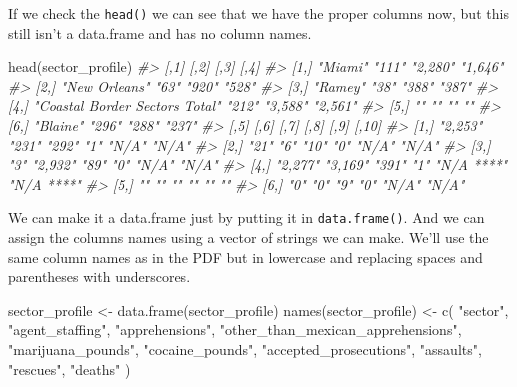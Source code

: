 \documentclass[
]{krantz}
\makeatletter
\newenvironment{Shaded}{\begin{snugshade}}{\end{snugshade}}
\newcommand{\CommentTok}[1]{\textcolor[rgb]{0.37,0.37,0.37}{\textit{#1}}}
\newcommand{\FunctionTok}[1]{\textcolor[rgb]{0,0,0}{#1}}
\newcommand{\NormalTok}[1]{#1}
\newcommand{\OtherTok}[1]{\textcolor[rgb]{0.37,0.37,0.37}{#1}}
\newcommand{\StringTok}[1]{\textcolor[rgb]{0.5,0.5,0.5}{#1}}
\newenvironment{kframe}{%
\medskip{}
\setlength{\fboxsep}{.8em}
 \def\at@end@of@kframe{}%
 \ifinner\ifhmode%
  \def\at@end@of@kframe{\end{minipage}}%
  \begin{minipage}{\columnwidth}%
 \fi\fi%
 \def\FrameCommand##1{\hskip\@totalleftmargin \hskip-\fboxsep
 \colorbox{shadecolor}{##1}\hskip-\fboxsep
     \hskip-\linewidth \hskip-\@totalleftmargin \hskip\columnwidth}%
 \MakeFramed {\advance\hsize-\width
   \@totalleftmargin\z@ \linewidth\hsize
   \@setminipage}}%
 {\par\unskip\endMakeFramed%
 \at@end@of@kframe}
\renewenvironment{Shaded}{\begin{kframe}}{\end{kframe}}
\makeatother
\begin{document}
If we check the \texttt{head()} we can see that we have the
proper columns now, but this still isn't a data.frame and
has no column names.

\begin{Shaded}
\begin{Highlighting}[]
\FunctionTok{head}\NormalTok{(sector\_profile)}
\CommentTok{\#\textgreater{}      [,1]                           [,2]  [,3]    [,4]   }
\CommentTok{\#\textgreater{} [1,] "Miami"                        "111" "2,280" "1,646"}
\CommentTok{\#\textgreater{} [2,] "New Orleans"                  "63"  "920"   "528"  }
\CommentTok{\#\textgreater{} [3,] "Ramey"                        "38"  "388"   "387"  }
\CommentTok{\#\textgreater{} [4,] "Coastal Border Sectors Total" "212" "3,588" "2,561"}
\CommentTok{\#\textgreater{} [5,] ""                             ""    ""      ""     }
\CommentTok{\#\textgreater{} [6,] "Blaine"                       "296" "288"   "237"  }
\CommentTok{\#\textgreater{}      [,5]    [,6]    [,7]  [,8] [,9]       [,10]     }
\CommentTok{\#\textgreater{} [1,] "2,253" "231"   "292" "1"  "N/A"      "N/A"     }
\CommentTok{\#\textgreater{} [2,] "21"    "6"     "10"  "0"  "N/A"      "N/A"     }
\CommentTok{\#\textgreater{} [3,] "3"     "2,932" "89"  "0"  "N/A"      "N/A"     }
\CommentTok{\#\textgreater{} [4,] "2,277" "3,169" "391" "1"  "N/A ****" "N/A ****"}
\CommentTok{\#\textgreater{} [5,] ""      ""      ""    ""   ""         ""        }
\CommentTok{\#\textgreater{} [6,] "0"     "0"     "9"   "0"  "N/A"      "N/A"}
\end{Highlighting}
\end{Shaded}

We can make it a data.frame just by putting it in
\texttt{data.frame()}. And we can assign the columns names
using a vector of strings we can make. We'll use the same
column names as in the PDF but in lowercase and replacing
spaces and parentheses with underscores.

\begin{Shaded}
\begin{Highlighting}[]
\NormalTok{sector\_profile }\OtherTok{\textless{}{-}} \FunctionTok{data.frame}\NormalTok{(sector\_profile)}
\FunctionTok{names}\NormalTok{(sector\_profile) }\OtherTok{\textless{}{-}} \FunctionTok{c}\NormalTok{(}
  \StringTok{"sector"}\NormalTok{,}
  \StringTok{"agent\_staffing"}\NormalTok{,}
  \StringTok{"apprehensions"}\NormalTok{,}
  \StringTok{"other\_than\_mexican\_apprehensions"}\NormalTok{,}
  \StringTok{"marijuana\_pounds"}\NormalTok{,}
  \StringTok{"cocaine\_pounds"}\NormalTok{,}
  \StringTok{"accepted\_prosecutions"}\NormalTok{,}
  \StringTok{"assaults"}\NormalTok{,}
  \StringTok{"rescues"}\NormalTok{,}
  \StringTok{"deaths"}
\NormalTok{)}
\end{Highlighting}
\end{Shaded}
\end{document}
